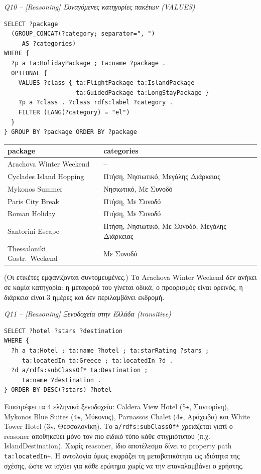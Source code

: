\documentclass[conference]{IEEEtran}
\newcommand{\query}[1]{\par\medskip\noindent\textit{#1}\par\nobreak\smallskip}
\newcommand{\cls}[1]{\textsf{#1}}          %
\begin{document}
\query{Q10 -- [Reasoning] Συναγόμενες κατηγορίες πακέτων (VALUES)}
\begin{lstlisting}
SELECT ?package
  (GROUP_CONCAT(?category; separator=", ")
     AS ?categories)
WHERE {
  ?p a ta:HolidayPackage ; ta:name ?package .
  OPTIONAL {
    VALUES ?class { ta:FlightPackage ta:IslandPackage
                    ta:GuidedPackage ta:LongStayPackage }
    ?p a ?class . ?class rdfs:label ?category .
    FILTER (LANG(?category) = "el")
  }
} GROUP BY ?package ORDER BY ?package
\end{lstlisting}
\begin{center}\scriptsize\setlength{\tabcolsep}{4pt}
\begin{tabular}{@{}ll@{}}
\toprule
package & categories \\
\midrule
Arachova Winter Weekend & -- \\
Cyclades Island Hopping & Πτήση, Νησιωτικό, Μεγάλης Διάρκειας \\
Mykonos Summer & Νησιωτικό, Με Συνοδό \\
Paris City Break & Πτήση, Με Συνοδό \\
Roman Holiday & Πτήση, Με Συνοδό \\
Santorini Escape & Πτήση, Νησιωτικό, Με Συνοδό, Μεγάλης Διάρκειας \\
Thessaloniki Gastr.\ Weekend & Με Συνοδό \\
\bottomrule
\end{tabular}\end{center}
(Οι ετικέτες εμφανίζονται συντομευμένες.) Το Arachova Winter Weekend δεν ανήκει
σε καμία κατηγορία: η μεταφορά του γίνεται οδικά, ο προορισμός είναι ορεινός, η
διάρκεια είναι 3 ημέρες και δεν περιλαμβάνει εκδρομή.

\query{Q11 -- [Reasoning] Ξενοδοχεία στην Ελλάδα (transitive)}
\begin{lstlisting}
SELECT ?hotel ?stars ?destination
WHERE {
  ?h a ta:Hotel ; ta:name ?hotel ; ta:starRating ?stars ;
     ta:locatedIn ta:Greece ; ta:locatedIn ?d .
  ?d a/rdfs:subClassOf* ta:Destination ;
     ta:name ?destination .
} ORDER BY DESC(?stars) ?hotel
\end{lstlisting}
Επιστρέφει τα 4 ελληνικά ξενοδοχεία: Caldera View Hotel (5$\star$, Σαντορίνη),
Mykonos Blue Suites (4$\star$, Μύκονος), Parnassos Chalet (4$\star$, Αράχωβα) και
White Tower Hotel (3$\star$, Θεσσαλονίκη). Το \texttt{a/rdfs:subClassOf*}
χρειάζεται γιατί ο reasoner αποθηκεύει μόνο τον πιο ειδικό τύπο κάθε στιγμιότυπου
(π.χ. \cls{IslandDestination}). Χωρίς reasoner, ίδιο αποτέλεσμα δίνει το property
path \texttt{ta:locatedIn+}. Η οντολογία όμως εκφράζει τη μεταβατικότητα ως ιδιότητα
της σχέσης, ώστε να ισχύει για κάθε ερώτημα χωρίς να την επαναλαμβάνει ο χρήστης.
\end{document}
